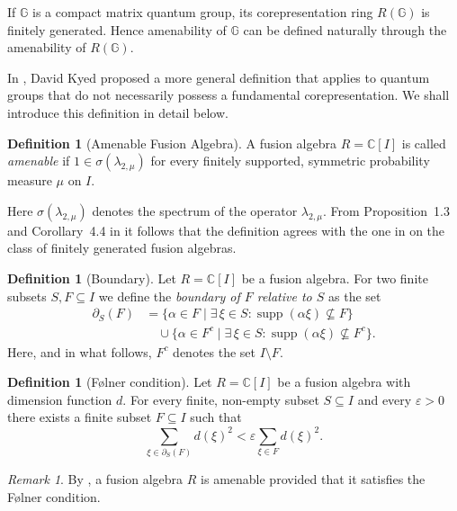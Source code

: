 \documentclass[12pt, reqno]{amsart}
\theoremstyle{definition}
\newtheorem{definition}[theorem]{Definition}
\theoremstyle{remark}
\newtheorem{remark}[theorem]{Remark}
\numberwithin{equation}{section}
\begin{document}
If $\mathbb{G}$ is a compact matrix quantum group, its corepresentation ring 
$R(\mathbb{G})$ is finitely generated. Hence amenability of $\mathbb{G}$ can 
be defined naturally through the amenability of $R(\mathbb{G})$.

In \cite{3}, David Kyed proposed a more general definition that applies to 
quantum groups that do not necessarily possess a fundamental corepresentation. 
We shall introduce this definition in detail below.

\begin{definition}[Amenable Fusion Algebra]\label{def:amenable}
A fusion algebra $R = \mathbb{C}[I]$ is called \emph{amenable} if 
$1 \in \sigma(\lambda_{2,\mu})$ for every finitely supported, symmetric 
probability measure $\mu$ on $I$.
\end{definition}

Here $\sigma(\lambda_{2,\mu})$ denotes the spectrum of the operator 
$\lambda_{2,\mu}$. From Proposition~1.3 and Corollary~4.4 in \cite{14} 
it follows that the definition agrees with the one in \cite{14} on the 
class of finitely generated fusion algebras.

\begin{definition}[Boundary]\label{def:boundary}
Let $R = \mathbb{C}[I]$ be a fusion algebra. For two finite subsets 
$S, F \subseteq I$ we define the \emph{boundary of $F$ relative to $S$} as 
the set
\begin{align*}
\partial_S(F) &= \{\alpha \in F \mid \exists\, \xi \in S : 
\operatorname{supp}(\alpha\xi) \nsubseteq F\} \\
&\quad \cup \{\alpha \in F^c \mid \exists\, \xi \in S : 
\operatorname{supp}(\alpha\xi) \nsubseteq F^c\}.
\end{align*}
Here, and in what follows, $F^c$ denotes the set $I \setminus F$.
\end{definition}

\begin{definition}[F{\o}lner condition]\label{def:folner}
Let $R = \mathbb{C}[I]$ be a fusion algebra with dimension function $d$. 
For every finite, non-empty subset $S \subseteq I$ and every 
$\varepsilon > 0$ there exists a finite subset $F \subseteq I$ such that
\[
\sum_{\xi \in \partial_S(F)} d(\xi)^2 < \varepsilon 
\sum_{\xi \in F} d(\xi)^2.
\]
\end{definition}

\begin{remark}
By \cite{3}, a fusion algebra $R$ is amenable provided that it satisfies the 
F{\o}lner condition.
\end{remark}
\end{document}
